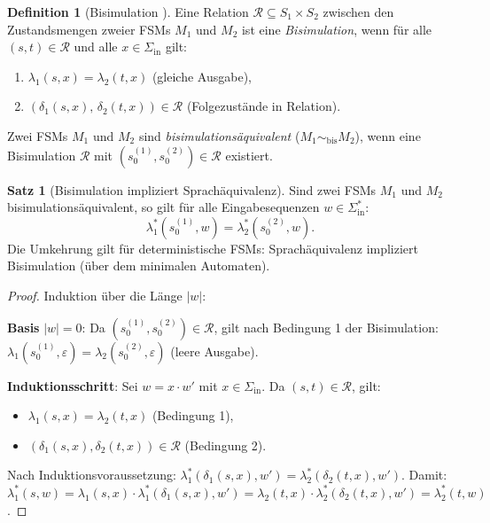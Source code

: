 ﻿\documentclass[a4paper,12pt]{article}
\theoremstyle{definition}
\newtheorem{definition}{Definition}
\newtheorem{satz}{Satz}
\begin{document}
\begin{definition}[Bisimulation \cite{hopcroft1971}]\label{def:bisimulation}
  Eine Relation $\mathcal{R} \subseteq S_1 \times S_2$ zwischen den Zustandsmengen
  zweier FSMs $M_1$ und $M_2$ ist eine \emph{Bisimulation}, wenn für alle
  $(s, t) \in \mathcal{R}$ und alle $x \in \Sigma_{\text{in}}$ gilt:
  \begin{enumerate}
    \item $\lambda_1(s, x) = \lambda_2(t, x)$ \quad (gleiche Ausgabe),
    \item $(\delta_1(s, x),\, \delta_2(t, x)) \in \mathcal{R}$ \quad (Folgezustände in Relation).
  \end{enumerate}
  Zwei FSMs $M_1$ und $M_2$ sind \emph{bisimulationsäquivalent} ($M_1 \sim_{\text{bis}} M_2$),
  wenn eine Bisimulation $\mathcal{R}$ mit $(s_0^{(1)}, s_0^{(2)}) \in \mathcal{R}$ existiert.
\end{definition}

\begin{satz}[Bisimulation impliziert Sprachäquivalenz]\label{satz:bisimsprache}
  Sind zwei FSMs $M_1$ und $M_2$ bisimulationsäquivalent, so gilt für alle
  Eingabesequenzen $w \in \Sigma_{\text{in}}^*$:
  \[
    \lambda_1^*(s_0^{(1)}, w) = \lambda_2^*(s_0^{(2)}, w).
  \]
  Die Umkehrung gilt für deterministische FSMs: Sprachäquivalenz impliziert Bisimulation
  (über dem minimalen Automaten).
\end{satz}

\begin{proof}
  Induktion über die Länge $|w|$:

  \textbf{Basis} $|w| = 0$: Da $(s_0^{(1)}, s_0^{(2)}) \in \mathcal{R}$, gilt nach
  Bedingung 1 der Bisimulation: $\lambda_1(s_0^{(1)}, \varepsilon) = \lambda_2(s_0^{(2)}, \varepsilon)$
  (leere Ausgabe).

  \textbf{Induktionsschritt}: Sei $w = x \cdot w'$ mit $x \in \Sigma_{\text{in}}$.
  Da $(s, t) \in \mathcal{R}$, gilt:
  \begin{itemize}
    \item $\lambda_1(s, x) = \lambda_2(t, x)$ (Bedingung 1),
    \item $(\delta_1(s, x), \delta_2(t, x)) \in \mathcal{R}$ (Bedingung 2).
  \end{itemize}
  Nach Induktionsvoraussetzung:
  $\lambda_1^*(\delta_1(s,x), w') = \lambda_2^*(\delta_2(t,x), w')$.
  Damit: $\lambda_1^*(s, w) = \lambda_1(s,x) \cdot \lambda_1^*(\delta_1(s,x), w')
  = \lambda_2(t,x) \cdot \lambda_2^*(\delta_2(t,x), w') = \lambda_2^*(t, w)$.
\end{proof}
\end{document}
